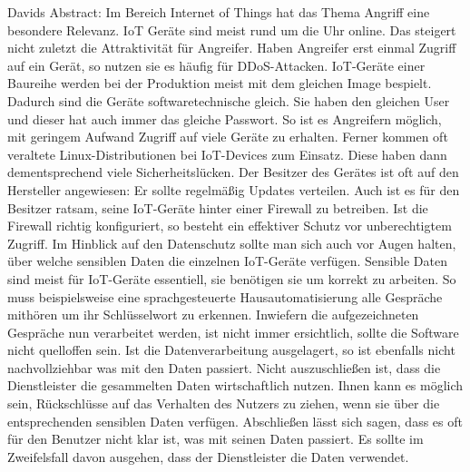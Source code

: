 
Davids Abstract:
Im Bereich Internet of Things hat das Thema Angriff eine besondere Relevanz. IoT Geräte sind meist rund um die Uhr online. Das steigert nicht zuletzt die Attraktivität für Angreifer. Haben Angreifer erst einmal Zugriff auf ein Gerät, so nutzen sie es häufig für DDoS-Attacken. IoT-Geräte einer Baureihe werden bei der Produktion meist mit dem gleichen Image bespielt. Dadurch sind die Geräte softwaretechnische gleich. Sie haben den gleichen User und dieser hat auch immer das gleiche Passwort. So ist es Angreifern möglich, mit geringem Aufwand Zugriff auf viele Geräte zu erhalten. Ferner kommen oft veraltete Linux-Distributionen bei IoT-Devices zum Einsatz. Diese haben dann dementsprechend viele Sicherheitslücken. Der Besitzer des Gerätes ist oft auf den Hersteller angewiesen: Er sollte regelmäßig Updates verteilen. Auch ist es für den Besitzer ratsam, seine IoT-Geräte hinter einer Firewall zu betreiben. Ist die Firewall richtig konfiguriert, so besteht ein effektiver Schutz vor unberechtigtem Zugriff. Im Hinblick auf den Datenschutz sollte man sich auch vor Augen halten, über welche sensiblen Daten die einzelnen IoT-Geräte verfügen. Sensible Daten sind meist für IoT-Geräte essentiell, sie benötigen sie um korrekt zu arbeiten. So muss beispielsweise eine sprachgesteuerte Hausautomatisierung alle Gespräche mithören um ihr Schlüsselwort zu erkennen. Inwiefern die aufgezeichneten Gespräche nun verarbeitet werden, ist nicht immer ersichtlich, sollte die Software nicht quelloffen sein. Ist die Datenverarbeitung ausgelagert, so ist ebenfalls nicht nachvollziehbar was mit den Daten passiert. Nicht auszuschließen ist, dass die Dienstleister die gesammelten Daten wirtschaftlich nutzen. Ihnen kann es möglich sein, Rückschlüsse auf das Verhalten des Nutzers zu ziehen, wenn sie über die entsprechenden sensiblen Daten verfügen. Abschließen lässt sich sagen, dass es oft für den Benutzer nicht klar ist, was mit seinen Daten passiert. Es sollte im Zweifelsfall davon ausgehen, dass der Dienstleister die Daten verwendet.